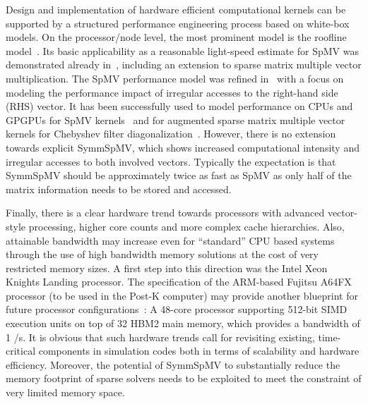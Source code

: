 	
Design and implementation of hardware efficient computational kernels can be
supported by a structured performance engineering process based on white-box
models. On the processor/node level, the most prominent model is the roof{}line
model~\cite{Williams_roofline}. Its basic applicability as a reasonable
light-speed estimate for \acrshort{SpMV} was  demonstrated already 
in~\cite{Gropp:1999}, including an extension to sparse matrix multiple vector
multiplication. The \acrshort{SpMV} performance model was refined
in~\cite{Moritz_sell} with a focus on modeling the performance impact
of irregular accesses to the right-hand side (RHS) vector. It has been
successfully used to model performance on CPUs and GPGPUs for \acrshort{SpMV}
kernels~\cite{Moritz_sell} and for augmented sparse matrix multiple vector kernels
for Chebyshev filter diagonalization~\cite{ISC2018:ChebFD}. However, there is no
extension towards explicit \acrshort{SymmSpMV}, which shows increased
computational intensity and irregular accesses to both involved vectors. Typically the
expectation is that \acrshort{SymmSpMV} should be approximately twice as fast
as \acrshort{SpMV} as only half of the matrix information needs to be stored and
accessed.

Finally, there is a clear hardware trend towards processors with advanced
vector-style processing, higher core counts and more complex cache
hierarchies. Also, attainable bandwidth may increase even for ``standard'' CPU
based systems through the use of high bandwidth memory solutions at the cost of
very restricted memory sizes. A first step into this direction was the Intel
Xeon Knights Landing processor. The specification of the ARM-based Fujitsu
A64FX processor (to be used in the Post-K computer) may provide another
blueprint for future processor configurations~\cite{Post-K:Processor}: A 48-core
processor supporting 512-bit SIMD execution units on top of 32 \GiB HBM2 main
memory, which provides a bandwidth of 1 \TB/s.  It is obvious that such hardware
trends call for revisiting existing, time-critical components in simulation
codes both in terms of scalability and hardware efficiency. Moreover, the
potential of \acrshort{SymmSpMV} to substantially reduce the memory footprint of
sparse solvers needs to be exploited to meet the constraint of very limited
memory space.

